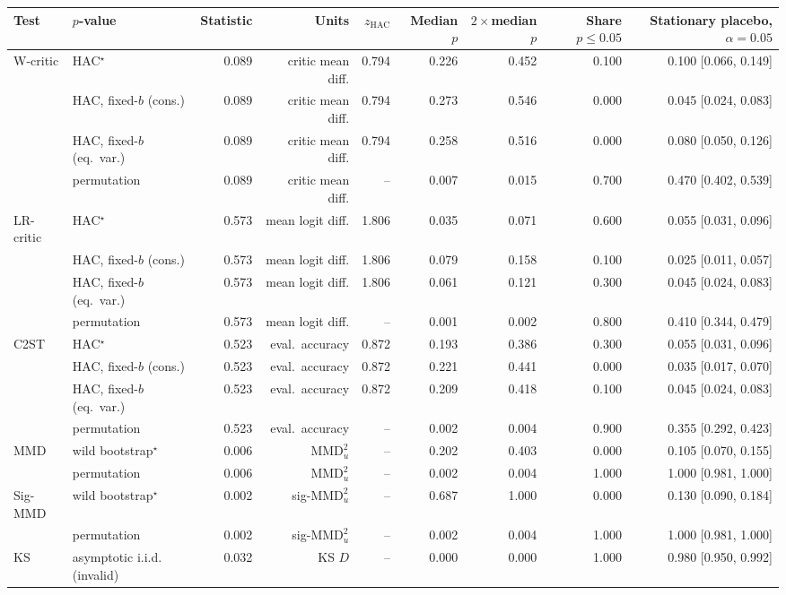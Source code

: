 \begin{tabular}{llrrrrrrr}
\toprule
Test & $p$-value & Statistic & Units & $z_{\mathrm{HAC}}$ & Median $p$ & $2\times$median $p$ & Share $p\le 0.05$ & Stationary placebo, $\alpha=0.05$ \\
\midrule
W-critic & HAC$^{\star}$ & 0.089 & critic mean diff. & 0.794 & 0.226 & 0.452 & 0.100 & 0.100 [0.066, 0.149] \\
 & HAC, fixed-$b$ (cons.) & 0.089 & critic mean diff. & 0.794 & 0.273 & 0.546 & 0.000 & 0.045 [0.024, 0.083] \\
 & HAC, fixed-$b$ (eq.\ var.) & 0.089 & critic mean diff. & 0.794 & 0.258 & 0.516 & 0.000 & 0.080 [0.050, 0.126] \\
 & permutation & 0.089 & critic mean diff. & -- & 0.007 & 0.015 & 0.700 & 0.470 [0.402, 0.539] \\
LR-critic & HAC$^{\star}$ & 0.573 & mean logit diff. & 1.806 & 0.035 & 0.071 & 0.600 & 0.055 [0.031, 0.096] \\
 & HAC, fixed-$b$ (cons.) & 0.573 & mean logit diff. & 1.806 & 0.079 & 0.158 & 0.100 & 0.025 [0.011, 0.057] \\
 & HAC, fixed-$b$ (eq.\ var.) & 0.573 & mean logit diff. & 1.806 & 0.061 & 0.121 & 0.300 & 0.045 [0.024, 0.083] \\
 & permutation & 0.573 & mean logit diff. & -- & 0.001 & 0.002 & 0.800 & 0.410 [0.344, 0.479] \\
C2ST & HAC$^{\star}$ & 0.523 & eval.\ accuracy & 0.872 & 0.193 & 0.386 & 0.300 & 0.055 [0.031, 0.096] \\
 & HAC, fixed-$b$ (cons.) & 0.523 & eval.\ accuracy & 0.872 & 0.221 & 0.441 & 0.000 & 0.035 [0.017, 0.070] \\
 & HAC, fixed-$b$ (eq.\ var.) & 0.523 & eval.\ accuracy & 0.872 & 0.209 & 0.418 & 0.100 & 0.045 [0.024, 0.083] \\
 & permutation & 0.523 & eval.\ accuracy & -- & 0.002 & 0.004 & 0.900 & 0.355 [0.292, 0.423] \\
MMD & wild bootstrap$^{\star}$ & 0.006 & $\mathrm{MMD}^2_u$ & -- & 0.202 & 0.403 & 0.000 & 0.105 [0.070, 0.155] \\
 & permutation & 0.006 & $\mathrm{MMD}^2_u$ & -- & 0.002 & 0.004 & 1.000 & 1.000 [0.981, 1.000] \\
Sig-MMD & wild bootstrap$^{\star}$ & 0.002 & sig-$\mathrm{MMD}^2_u$ & -- & 0.687 & 1.000 & 0.000 & 0.130 [0.090, 0.184] \\
 & permutation & 0.002 & sig-$\mathrm{MMD}^2_u$ & -- & 0.002 & 0.004 & 1.000 & 1.000 [0.981, 1.000] \\
KS & asymptotic i.i.d. (invalid) & 0.032 & KS $D$ & -- & 0.000 & 0.000 & 1.000 & 0.980 [0.950, 0.992] \\
\bottomrule
\end{tabular}
